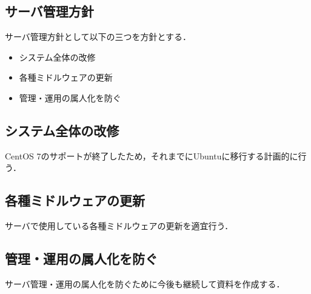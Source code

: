 \subsection*{サーバ管理方針}


サーバ管理方針として以下の三つを方針とする．
\begin{itemize}
    \item システム全体の改修
    \item 各種ミドルウェアの更新
    \item 管理・運用の属人化を防ぐ
\end{itemize}

\subsection*{システム全体の改修}
CentOS 7のサポートが終了したため，それまでにUbuntuに移行する計画的に行う．

\subsection*{各種ミドルウェアの更新}
サーバで使用している各種ミドルウェアの更新を適宜行う．

\subsection*{管理・運用の属人化を防ぐ}
サーバ管理・運用の属人化を防ぐために今後も継続して資料を作成する．
